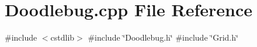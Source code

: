 \section{Doodlebug.\+cpp File Reference}
\label{Doodlebug_8cpp}
{\ttfamily \#include $<$cstdlib$>$}\newline
{\ttfamily \#include \char`\"{}Doodlebug.\+h\char`\"{}}\newline
{\ttfamily \#include \char`\"{}Grid.\+h\char`\"{}}\newline
